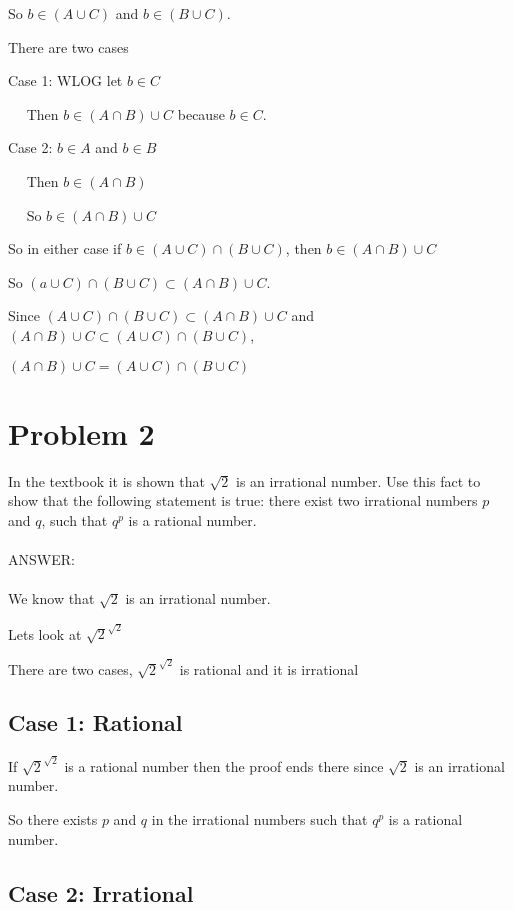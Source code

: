 \documentclass[letterpaper, 11pt]{article}
\begin{document}
So $b \in (A \cup C)$ and $b \in (B \cup C)$.

There are two cases

Case 1: WLOG let $b \in C$

$\quad$ Then $b \in (A \cap B) \cup C$ because $b \in C$.

Case 2: $b \in A$ and $b \in B$

$\quad$ Then $b \in (A \cap B)$

$\quad$ So $b \in (A \cap B) \cup C$

So in either case if $b \in (A \cup C) \cap (B \cup C)$, then $b \in (A \cap B) \cup C$

So $(a \cup C) \cap (B \cup C) \subset (A \cap B) \cup C$.

Since $(A \cup C) \cap (B \cup C) \subset (A \cap B) \cup C$ and $(A \cap B) \cup C \subset (A \cup C) \cap (B \cup C)$,

 $(A \cap B) \cup C = (A \cup C) \cap (B \cup C)$
 
\newpage

\section{Problem 2}
 In the textbook it is shown that $\sqrt{2}$ is an irrational number. Use this fact to show that
the following statement is true: there exist two irrational numbers $p$ and $q$, such that $q^{p}$ is a rational number.\\\\
ANSWER:\\\\
We know that $\sqrt{2}$ is an irrational number.

Lets look at $\sqrt{2}^{\sqrt{2}}$

There are two cases, $\sqrt{2}^{\sqrt{2}}$ is rational and it is irrational

\subsection*{Case 1: Rational}
If $\sqrt{2}^{\sqrt{2}}$ is a rational number then the proof ends there since $\sqrt{2}$ is an irrational number.

So there exists $p$ and $q$ in the irrational numbers such that $q^{p}$ is a rational number.

\subsection*{Case 2: Irrational}
\end{document}

